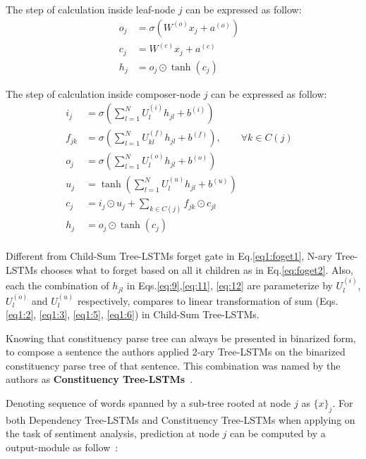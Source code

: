 The step of calculation inside leaf-node \(j\) can be expressed as follow:
\begin{align}
	o_j &= \sigma{\left( W^{(o)} x_j + a^{\left(o\right)}\right)} & \\
   	c_j &= W^{(c)} x_j + a^{(c)} & \\
	h_j &= o_j \odot \tanh{\left(c_j\right)} &
\end{align}

The step of calculation inside composer-node \(j\) can be expressed as follow:
\begin{align}
  	i_j &= \sigma{ \left(\sum_{l=1}^{N}U_l^{(i)} h_{jl} + b^{(i)} \right) } &\label{eq:9}\\
  	f_{jk} &= \sigma{\left(\sum_{l=1}^{N}U_{kl}^{\left(f\right)} h_{jl} + b^{\left(f\right)}\right)}, \qquad  \forall k \in C(j) & \label{eq:foget2}\\ 
  	o_j &= \sigma{\left( \sum_{l=1}^{N}U_l^{\left(o\right)} h_{jl} + b^{\left(o\right)}\right)} &\label{eq:11}\\
  	u_j &= \tanh{\left( \sum_{l=1}^{N}U_l^{\left(u\right)} h_{jl} + b^{\left(u\right)}\right)} &\label{eq:12}\\
   	c_j &= i_j \odot u_j + \sum_{k \in C\left(j\right)} f_{jk} \odot c_{jl} & \\
	h_j &= o_j \odot \tanh{\left(c_j\right)} & \\
\end{align}

Different from Child-Sum Tree-LSTMs forget gate in Eq.\eqref{eq1:foget1}, N-ary Tree-LSTMs chooses what to forget based on all it children as in Eq.\eqref{eq:foget2}. 
Also, each the combination of \(h_{jl}\) in Eqs.\eqref{eq:9},\eqref{eq:11}, \eqref{eq:12} are parameterize by \(U_l^{(i)}\), \(U_l^{(o)}\) and \(U_l^{(u)}\) respectively, compares to linear transformation of sum (Eqs.\eqref{eq1:2}, \eqref{eq1:3}, \eqref{eq1:5}, \eqref{eq1:6}) in Child-Sum Tree-LSTMs.

Knowing that constituency parse tree can always be presented in binarized form, to compose a sentence the authors applied 2-ary Tree-LSTMs on the binarized constituency parse tree of that sentence. 
This combination was named by the authors as \textbf{Constituency Tree-LSTMs}~\cite{treeLSTM}.

Denoting sequence of words spanned by a sub-tree rooted at node \(j\) as \(\{x\}_j\). 
For both Dependency Tree-LSTMs and Constituency Tree-LSTMs when applying on the task of sentiment analysis, prediction at node \(j\) can be computed by a output-module as follow~\cite{treeLSTM}:

